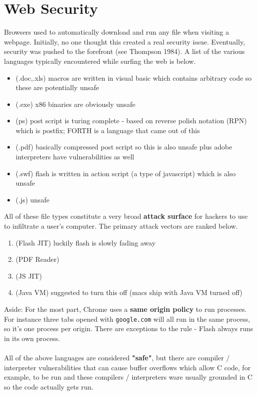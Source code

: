 \documentclass[twoside]{article}
\begin{document}
\section{Web Security}
Browsers used to automatically download and run any file when visiting a webpage.  Initially, no one thought this created a real security issue.  Eventually, security was pushed to the forefront (see Thompson 1984).  A list of the various languages typically encountered while surfing the web is below.
%
\begin{itemize}
	\item (.doc,.xls) macros are written in visual basic which contains arbitrary code so these are potentially unsafe
	\item (.exe) x86 binaries are obviously unsafe
	\item (ps) post script is turing complete - based on reverse polish notation (RPN) which is postfix; FORTH is a language that came out of this
	\item (.pdf) basically compressed post script so this is also unsafe plus adobe interpreters have vulnerabilities as well
	\item (.swf) flash is written in action script (a type of javascript) which is also unsafe
	\item (.js) unsafe
\end{itemize}
%
All of these file types constitute a very broad \textbf{attack surface} for hackers to use to infiltrate a user's computer.  The primary attack vectors are ranked below.
%
\begin{enumerate}
\item (Flash JIT) luckily flash is slowly fading away
\item (PDF Reader)
\item (JS JIT)
\item (Java VM) suggested to turn this off (macs ship with Java VM turned off)
\end{enumerate}
Aside: For the most part, Chrome uses a \textbf{same origin policy} to run processes.  For instance three tabs opened with \verb;google.com; will all run in the same process, so it's one process per origin.  There are exceptions to the rule - Flash always runs in its own process.\\
\\
All of the above languages are considered \textbf{"safe"}, but there are compiler / interpreter vulnerabilities that can cause buffer overflows which allow C code, for example, to be run and these compilers / interpreters ware usually grounded in C so the code actually gets run.\\
\end{document}
